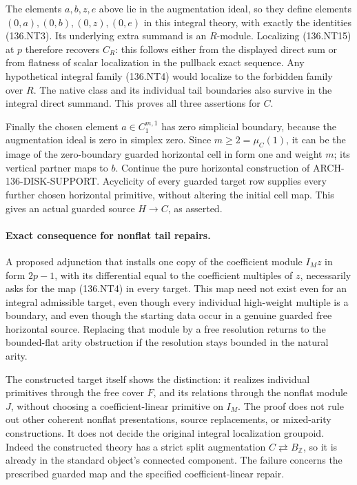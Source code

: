 The elements \(a,b,z,e\) above lie in the augmentation ideal,
so they define elements \((0,a),(0,b),(0,z),(0,e)\) in this
integral theory, with exactly the identities (136.NT3).
Its underlying extra summand is an \(R\)-module. Localizing
(136.NT15) at \(p\) therefore recovers \(C_R\): this follows
either from the displayed direct sum or from flatness of scalar
localization in the pullback exact sequence. Any hypothetical
integral family (136.NT4) would localize to the forbidden family
over \(R\). The native class and its individual tail boundaries
also survive in the integral direct summand. This proves all
three assertions for \(C\).

Finally the chosen element \(a\in C_1^{m,1}\) has zero
simplicial boundary, because the augmentation ideal is zero
in simplex zero. Since \(m\geq2=\mu_C(1)\), it can be the
image of the zero-boundary guarded horizontal cell in form one
and weight \(m\); its vertical partner maps to \(b\).
Continue the pure horizontal construction of
ARCH-136-DISK-SUPPORT. Acyclicity of every guarded target row
supplies every further chosen horizontal primitive, without
altering the initial cell map. This gives an actual guarded
source \(H\to C\), as asserted.

\paragraph{Exact consequence for nonflat tail repairs.}
A proposed adjunction that installs one copy of the coefficient
module \(I_Mz\) in form \(2p-1\), with its differential equal
to the coefficient multiples of \(z\), necessarily asks for
the map (136.NT4) in every target. This map need not exist even
for an integral admissible target, even though every individual
high-weight multiple is a boundary, and even though the starting
data occur in a genuine guarded free horizontal source.
Replacing that module by a free resolution returns to the
bounded-flat arity obstruction if the resolution stays bounded
in the natural arity.

The constructed target itself shows the distinction: it realizes
individual primitives through the free cover \(F\), and its
relations through the nonflat module \(J\), without choosing a
coefficient-linear primitive on \(I_M\). The proof does not rule
out other coherent nonflat presentations, source replacements,
or mixed-arity constructions. It does not decide the original
integral localization groupoid.
Indeed the constructed theory has a strict split augmentation
\(C\rightleftarrows B_{\mathbb Z}\), so it is already in the
standard object's connected component. The failure concerns the
prescribed guarded map and the specified coefficient-linear repair.
